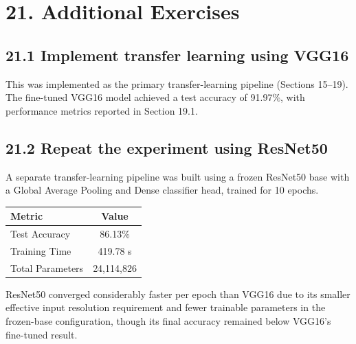 \documentclass[11pt]{article}
\begin{document}

\section*{21. Additional Exercises}

\subsection*{21.1 Implement transfer learning using VGG16}

This was implemented as the primary transfer-learning pipeline (Sections 15--19). The fine-tuned VGG16 model achieved a test accuracy of 91.97\%, with performance metrics reported in Section 19.1.

\vspace{5mm}

\subsection*{21.2 Repeat the experiment using ResNet50}

A separate transfer-learning pipeline was built using a frozen ResNet50 base with a Global Average Pooling and Dense classifier head, trained for 10 epochs.

\begin{center}

\begin{tabular}{|l|c|}

\hline

Metric & Value\\

\hline

Test Accuracy & 86.13\%\\

\hline

Training Time & 419.78 s\\

\hline

Total Parameters & 24,114,826\\

\hline

\end{tabular}

\end{center}

ResNet50 converged considerably faster per epoch than VGG16 due to its smaller effective input resolution requirement and fewer trainable parameters in the frozen-base configuration, though its final accuracy remained below VGG16's fine-tuned result.
\end{document}
